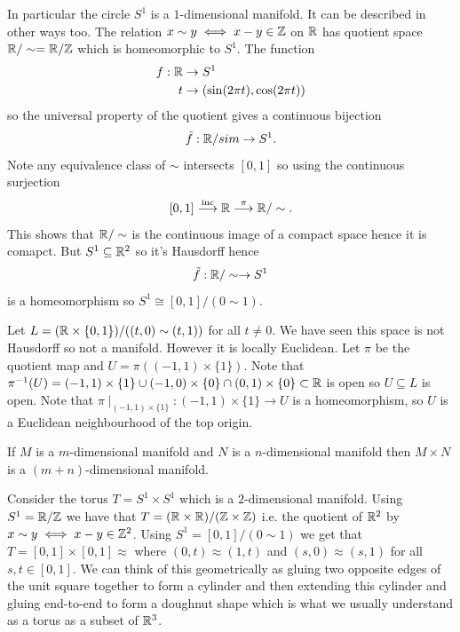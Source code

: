 \documentclass{article}
\begin{document}
\begin{example}
  In particular the circle $ S^1 $ is a $ 1 $-dimensional manifold. It  can be described in other ways too. The relation $ x\sim y\iff x-y\in \mathbb{Z} $ on $ \mathbb{R} $ has quotient space $ \mathbb{R}/\sim = \mathbb{R}/ \mathbb{Z} $ which is homeomorphic to $ S^1 $. The function
  \begin{align*}
	  f : \mathbb{R} &\to S^1\\
	  t &\to (\sin(2\pi t), \cos(2\pi t))
  \end{align*}
  so the universal property of the quotient gives a continuous bijection
  \[
    \tilde f: \mathbb{R}/sim \to S^1.
  \]
  Note any equivalence class of $ \sim $ intersects $ [0,1] $ so using the continuous surjection 
  \[
	  [0,1]\overset{\text{inc}}{\longrightarrow} \mathbb{R} \overset{\pi}{\longrightarrow} \mathbb{R}/\sim.
  \]
  This shows that $ \mathbb{R}/\sim $ is the continuous image of a compact space hence it is comapct. But $ S^1\subseteq \mathbb{R}^2 $ so it's Hausdorff hence
  \[
    \tilde f: \mathbb{R}/\sim \to S^1
  \]
  is a homeomorphism so $ S^1\cong [0,1]/(0\sim 1) $.
\end{example}
\begin{example}
	Let $ L= (\mathbb{R}\times \{0,1\})/((t,0)\sim (t,1)) $ for all $ t\ne 0 $. We have seen this space is not Hausdorff so not a manifold. However it is locally Euclidean. Let $ \pi $ be the quotient map and $ U = \pi((-1,1)\times \{1\}) $. Note that $ {\pi}^{-1} (U) =(-1,1)\times \{1\} \cup (-1,0)\times \{0\} \cap (0,1)\times \{0\}\subset \mathbb{R} $ is open so $ U\subseteq L $ is open. Note that $ \pi\mid_{(-1,1)\times \{1\}}: (-1,1)\times \{1\}\to U $ is a homeomorphism, so $ U $ is a Euclidean neighbourhood of the top origin. 
\end{example}
\begin{example}
  If $ M $ is a $ m $-dimensional manifold and $ N $ is a $ n $-dimensional manifold then $ M\times N $ is a $ (m+n) $-dimensional manifold.
\end{example}
\begin{example}
	Consider the torus $ T = S^1 \times S^1 $ which is a $ 2 $-dimensional manifold. Using $ S^1 = \mathbb{R}/\mathbb{Z} $ we have that $ T = (\mathbb{R}\times \mathbb{R})/(\mathbb{Z}\times \mathbb{Z}) $ i.e. the quotient of $ \mathbb{R}^2 $ by $ x\sim y\iff x-y\in \mathbb{Z}^2 $. Using $ S^1 = [0,1]/(0\sim 1) $ we get that $ T = [0,1]\times [0,1]\approx $ where $ (0,t)\approx (1,t) $ and $ (s,0)\approx (s,1) $ for all $ s,t\in [0,1] $. We can think of this geometrically as gluing two opposite edges of the unit square together to form a cylinder and then extending this cylinder and gluing end-to-end to form a doughnut shape which is what we usually understand as a torus as a subset of $ \mathbb{R}^3 $.
\end{example}
\end{document}
